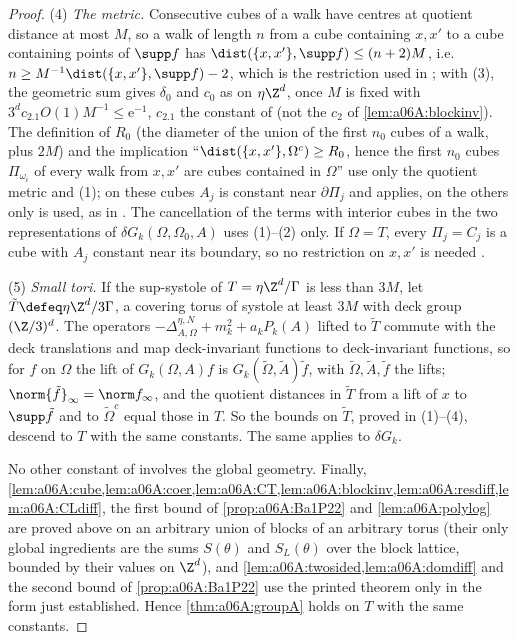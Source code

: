 \begin{proof}
(4) \emph{The metric.} Consecutive cubes of a walk have centres at quotient distance at most $M$, so a walk of length $n$ from a cube containing $x,x'$ to a cube containing points of $\supp f$ has $\dist(\{x,x'\},\supp f)\le(n+2)M$, i.e.\ $n\ge M^{-1}\dist(\{x,x'\},\supp f)-2$, which is the restriction used in \cite[(2.22)]{Ba4}; with (3), the geometric sum \cite[(2.22)]{Ba4} gives $\delta_0$ and $c_0$ as on $\eta\Z^d$, once $M$ is fixed with $3^dc_{2.1}O(1)M^{-1}\le\mathrm e^{-1}$, $c_{2.1}$ the constant of \cite[Lemma~2.1, (2.15)]{Ba4} (not the $c_2$ of \cref{lem:a06A:blockinv}). The definition \cite[(2.19)]{Ba4} of $R_0$ (the diameter of the union of the first $n_0$ cubes of a walk, plus $2M$) and the implication ``$\dist(\{x,x'\},\Omega^c)\ge R_0$, hence the first $n_0$ cubes $\Pi_{\omega_i}$ of every walk from $x,x'$ are cubes contained in $\Omega$'' use only the quotient metric and (1); on these cubes $A_j$ is constant near $\partial\Pi_j$ and \cite[Lemma~2.2]{Ba4} applies, on the others only \cite[Lemma~2.1]{Ba4} is used, as in \cite[(2.20)--(2.21)]{Ba4}. The cancellation of the terms with interior cubes in the two representations of $\delta G_k(\Omega,\Omega_0,A)$ \cite[p.~579]{Ba4} uses (1)--(2) only. If $\Omega=T$, every $\Pi_j=C_j$ is a cube with $A_j$ constant near its boundary, so no restriction on $x,x'$ is needed \cite[p.~611]{Ba1}.

(5) \emph{Small tori.} If the sup-systole of $T=\eta\Z^d/\Gamma$ is less than $3M$, let $\tilde T\defeq\eta\Z^d/3\Gamma$, a covering torus of systole at least $3M$ with deck group $(\Z/3)^d$. The operators $-\Delta^{\eta,N}_{A,\Omega}+m_k^2+a_kP_k(A)$ lifted to $\tilde T$ commute with the deck translations and map deck-invariant functions to deck-invariant functions, so for $f$ on $\Omega$ the lift of $G_k(\Omega,A)f$ is $G_k(\tilde\Omega,\tilde A)\tilde f$, with $\tilde\Omega,\tilde A,\tilde f$ the lifts; $\norm{\tilde f}_\infty=\norm f_\infty$, and the quotient distances in $\tilde T$ from a lift of $x$ to $\supp\tilde f$ and to $\tilde\Omega^c$ equal those in $T$. So the bounds on $\tilde T$, proved in (1)--(4), descend to $T$ with the same constants. The same applies to $\delta G_k$.

No other constant of \cite[Sect.~2]{Ba4} involves the global geometry. Finally, \cref{lem:a06A:cube,lem:a06A:coer,lem:a06A:CT,lem:a06A:blockinv,lem:a06A:resdiff,lem:a06A:CLdiff}, the first bound of \cref{prop:a06A:Ba1P22} and \cref{lem:a06A:polylog} are proved above on an arbitrary union of blocks of an arbitrary torus (their only global ingredients are the sums $S(\theta)$ and $S_L(\theta)$ over the block lattice, bounded by their values on $\Z^d$), and \cref{lem:a06A:twosided,lem:a06A:domdiff} and the second bound of \cref{prop:a06A:Ba1P22} use the printed theorem only in the form just established. Hence \cref{thm:a06A:groupA} holds on $T$ with the same constants.
\end{proof}
